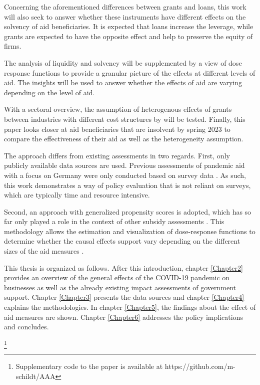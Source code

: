 Concerning the aforementioned differences between grants and loans, this work will also seek to answer whether these instruments have different effects on the solvency of aid beneficiaries. It is expected that loans increase the leverage, while grants are expected to have the opposite effect and help to preserve the equity of firms.

The analysis of liquidity and solvency will be supplemented by a view of dose response functions to provide a granular picture of the effects at different levels of aid. The insights will be used to answer whether the effects of aid are varying depending on the level of aid. 

With a sectoral overview, the assumption of heterogenous effects of grants between industries with different cost structures by \parencite{bischof_bedeutung_2021} will be tested. Finally, this paper looks closer at aid beneficiaries that are insolvent by spring 2023 to compare the effectiveness of their aid as well as the heterogeneity assumption.

The approach differs from existing assessments in two regards. First, only publicly available data sources are used. Previous assessments of pandemic aid with a focus on Germany were only conducted based on survey data \parencite{marek_impact_2022,bertschek_german_2022,dorr_small_2022,bischof_bedeutung_2021}. As such, this work demonstrates a way of policy evaluation that is not reliant on surveys, which are typically time and resource intensive.

Second, an approach with generalized propensity scores is adopted, which has so far only played a role in the context of other subsidy assessments \parencite{selebaj_effects_2021,carboni_effect_2017}. This methodology allows the estimation and visualization of dose-response functions to determine whether the causal effects support vary depending on the different sizes of the aid measures \parencite{selebaj_effects_2021}.

This thesis is organized as follows. After this introduction, chapter \ref{Chapter2} provides an overview of the general effects of the COVID-19 pandemic on businesses as well as the already existing impact assessments of government support. Chapter \ref{Chapter3} presents the data sources and chapter \ref{Chapter4} explains the methodologies. In chapter \ref{Chapter5}, the findings about the effect of aid measures are shown. Chapter \ref{Chapter6} addresses the policy implications and concludes. 

\footnote{Supplementary code to the paper is available at https://github.com/m-schildt/AAA}


